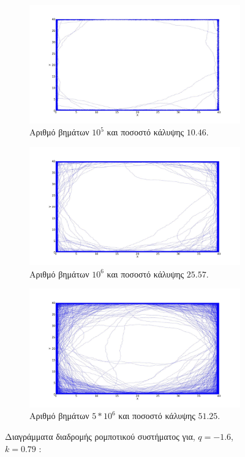 \begin{figure}[ht]
\centering
\begin{subfigure}[b]{0.75\textwidth}
	\centering
	\includegraphics[width=\textwidth]{LateX images/log/steps/g3-1.6}
	\caption{Αριθμό βημάτων $10^5$ και ποσοστό κάλυψης $10.46$.}
	\label{f:g109}
\end{subfigure}
\hfill
\begin{subfigure}[b]{0.75\textwidth}
	\centering
	\includegraphics[width=\textwidth]{LateX images/log/steps/g2-1.6}
	\caption{Αριθμό βημάτων $10^6$ και ποσοστό κάλυψης $25.57$.}
	\label{f:g110}
\end{subfigure}
\hfill
\begin{subfigure}[b]{0.75\textwidth}
	\centering
	\includegraphics[width=\textwidth]{LateX images/log/steps/g1-1.6}
	\caption{Αριθμό βημάτων $5*10^6$ και ποσοστό κάλυψης $51.25$.}
	\label{f:g111}
\end{subfigure}
\hfill
\caption{Διαγράμματα διαδρομής ρομποτικού συστήματος για, $q = -1.6$, $k = 0.79$ :}
\end{figure}

